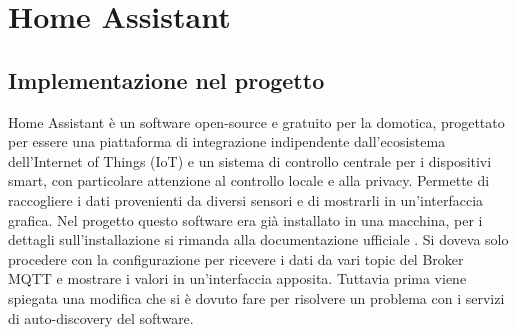 
\chapter{Home Assistant}
\label{ch:homeassistant}

\section{Implementazione nel progetto}
\label{sec:hass-introduzione}
Home Assistant è un software open-source e gratuito per la domotica, 
progettato per essere una piattaforma di integrazione indipendente dall'ecosistema dell'Internet of Things (IoT) 
e un sistema di controllo centrale per i dispositivi smart, 
con particolare attenzione al controllo locale e alla privacy.
Permette di raccogliere i dati provenienti da diversi sensori e di mostrarli in un'interfaccia grafica.
Nel progetto questo software era già installato in una macchina, 
per i dettagli sull'installazione si rimanda alla documentazione ufficiale \cite{hass-installazione}. 
Si doveva solo procedere con la configurazione per ricevere i dati da vari topic del Broker MQTT 
e mostrare i valori in un'interfaccia apposita.
Tuttavia prima viene spiegata una modifica che si è dovuto fare per risolvere un problema con i 
servizi di auto-discovery del software.

